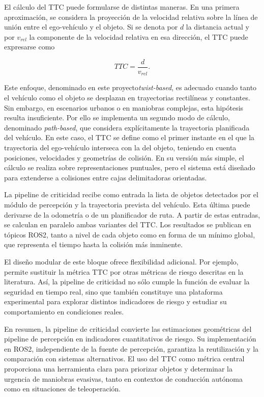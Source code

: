 El cálculo del TTC puede formularse de distintas maneras. En una primera
aproximación, se considera la proyección de la velocidad relativa sobre la
línea de unión entre el ego-vehículo y el objeto. Si se denota por $d$ la
distancia actual y por $v_{rel}$ la componente de la velocidad relativa en esa
dirección, el TTC puede expresarse como

\[
TTC = \frac{d}{v_{rel}}.
\]

Este enfoque, denominado en este proyecto\textit{twist-based}, es adecuado cuando
tanto el vehículo como el objeto se desplazan en trayectorias rectilíneas y
constantes. Sin embargo, en escenarios urbanos o en maniobras complejas, esta
hipótesis resulta insuficiente. Por ello se implementa un segundo modo de
cálculo, denominado \textit{path-based}, que considera explícitamente la
trayectoria planificada del vehículo. En este caso, el TTC se define como el
primer instante en el que la trayectoria del ego-vehículo interseca con la del
objeto, teniendo en cuenta posiciones, velocidades y geometrías de colisión. En
su versión más simple, el cálculo se realiza sobre representaciones puntuales,
pero el sistema está diseñado para extenderse a colisiones entre cajas
delimitadoras orientadas.

La pipeline de criticidad recibe como entrada la lista de objetos detectados
por el módulo de percepción y la trayectoria prevista del vehículo. Esta
última puede derivarse de la odometría o de un planificador de ruta. A partir
de estas entradas, se calculan en paralelo ambas variantes del TTC. Los
resultados se publican en tópicos ROS2, tanto a nivel de cada objeto como en
forma de un mínimo global, que representa el tiempo hasta la colisión más
inminente.


El diseño modular de este bloque ofrece flexibilidad adicional. Por ejemplo,
permite sustituir la métrica TTC por otras métricas de riesgo descritas en la
literatura. Así, la
pipeline de criticidad no sólo cumple la función de evaluar la seguridad en
tiempo real, sino que también constituye una plataforma experimental para
explorar distintos indicadores de riesgo y estudiar su comportamiento en
condiciones reales.

En resumen, la pipeline de criticidad convierte las estimaciones geométricas
del pipeline de percepción en indicadores cuantitativos de riesgo. Su
implementación en ROS2, independiente de la fuente de percepción, garantiza la
reutilización y la comparación con sistemas alternativos. El uso del TTC como
métrica central proporciona una herramienta clara para priorizar objetos y
determinar la urgencia de maniobras evasivas, tanto en contextos de conducción
autónoma como en situaciones de teleoperación.



